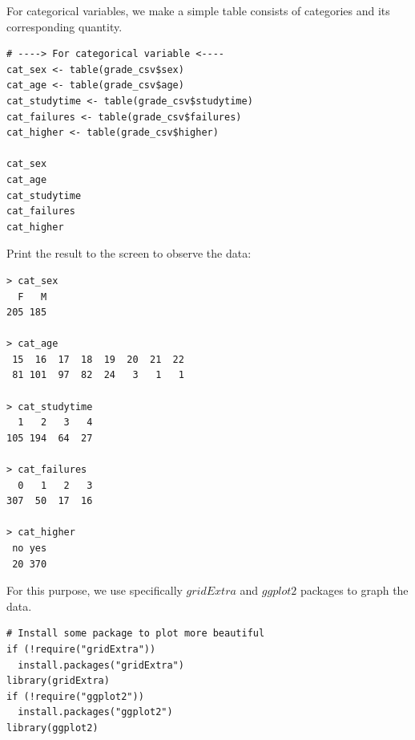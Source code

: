 \documentclass[a4paper]{article}
\newcounter{subsubsubsection}[subsubsection]
\numberwithin{equation}{section}
\begin{document}
For categorical variables, we make a simple table consists of categories and its corresponding quantity.
\begin{mdframed}[leftline=false,rightline=false,backgroundcolor=magenta!10,nobreak=true]
  \begin{verbatim}
# ----> For categorical variable <----
cat_sex <- table(grade_csv$sex)
cat_age <- table(grade_csv$age)
cat_studytime <- table(grade_csv$studytime)
cat_failures <- table(grade_csv$failures)
cat_higher <- table(grade_csv$higher)

cat_sex
cat_age
cat_studytime
cat_failures
cat_higher
  \end{verbatim}
\end{mdframed}

Print the result to the screen to observe the data:
\begin{mdframed}[leftline=false,rightline=false,backgroundcolor=teal!10,nobreak=true]
  \begin{verbatim}
> cat_sex
  F   M
205 185

> cat_age
 15  16  17  18  19  20  21  22
 81 101  97  82  24   3   1   1

> cat_studytime
  1   2   3   4
105 194  64  27

> cat_failures
  0   1   2   3
307  50  17  16

> cat_higher
 no yes
 20 370
  \end{verbatim}
\end{mdframed}

For this purpose, we use specifically \(gridExtra\) and \(ggplot2\) packages to graph the data.

\begin{mdframed}[leftline=false,rightline=false,backgroundcolor=magenta!10,nobreak=true]
  \begin{verbatim}
# Install some package to plot more beautiful
if (!require("gridExtra"))
  install.packages("gridExtra")
library(gridExtra)
if (!require("ggplot2"))
  install.packages("ggplot2")
library(ggplot2)
  \end{verbatim}
\end{mdframed}
\end{document}
